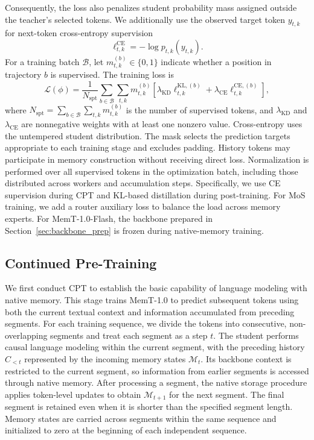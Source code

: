 Consequently, the loss also penalizes student probability mass assigned outside the teacher's selected tokens.
We additionally use the observed target token $y_{t,k}$ for next-token cross-entropy supervision
\begin{equation*}
    \ell^{\mathrm{CE}}_{t,k}=-\log p_{t,k}(y_{t,k}).
\end{equation*}
For a training batch $\mathcal{B}$, let $m^{(b)}_{t,k}\in\{0,1\}$ indicate whether a position in trajectory $b$ is supervised.
The training loss is
\begin{equation*}
    \mathcal{L}(\phi)
    = \frac{1}{N_{\mathrm{spt}}}
    \sum_{b\in\mathcal{B}}\sum_{t,k}m^{(b)}_{t,k}
    \left[
        \lambda_{\mathrm{KD}}\ell^{\mathrm{KL},(b)}_{t,k}
        +\lambda_{\mathrm{CE}}\ell^{\mathrm{CE},(b)}_{t,k}
    \right],
\end{equation*}
where $N_{\mathrm{spt}}=\sum_{b\in\mathcal{B}}\sum_{t,k}m^{(b)}_{t,k}$ is the number of supervised tokens, and $\lambda_{\mathrm{KD}}$ and $\lambda_{\mathrm{CE}}$ are nonnegative weights with at least one nonzero value.
Cross-entropy uses the untempered student distribution.
The mask selects the prediction targets appropriate to each training stage and excludes padding.
History tokens may participate in memory construction without receiving direct loss.
Normalization is performed over all supervised tokens in the optimization batch, including those distributed across workers and accumulation steps.
Specifically, we use CE supervision during CPT and KL-based distillation during post-training.
For MoS training, we add a router auxiliary loss to balance the load across memory experts.
For MemT-1.0-Flash, the backbone prepared in Section~\ref{sec:backbone_prep} is frozen during native-memory training.

\subsection{Continued Pre-Training}

We first conduct CPT to establish the basic capability of language modeling with native memory.
This stage trains MemT-1.0 to predict subsequent tokens using both the current textual context and information accumulated from preceding segments.
For each training sequence, we divide the tokens into consecutive, non-overlapping segments and treat each segment as a step $t$.
The student performs causal language modeling within the current segment, with the preceding history $C_{<t}$ represented by the incoming memory states $\bm{\mathcal{M}}_t$.
Its backbone context is restricted to the current segment, so information from earlier segments is accessed through native memory.
After processing a segment, the native storage procedure applies token-level updates to obtain $\bm{\mathcal{M}}_{t+1}$ for the next segment.
The final segment is retained even when it is shorter than the specified segment length.
Memory states are carried across segments within the same sequence and initialized to zero at the beginning of each independent sequence.

